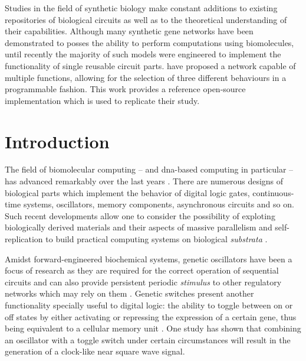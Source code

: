 
  \noindent Studies in the field of synthetic biology make constant additions to existing repositories of biological circuits as well as to the theoretical understanding of their capabilities.
  Although many synthetic gene networks have been demonstrated to posses the ability to perform computations using biomolecules, until recently the majority of such models were engineered to implement the functionality of single reusable circuit parts.
  \citet{originals} have proposed a network capable of multiple functions, allowing for the selection of three different behaviours in a programmable fashion.
  This work provides a reference open-source implementation which is used to replicate their study.


\section{Introduction}

  The field of biomolecular computing -- and \acs{dna}-based computing in particular -- has advanced remarkably over the last years \cite{analog}.
  There are numerous designs of biological parts which implement the behavior of digital logic gates\supercite{async}, continuous-time systems\supercite{analog}, oscillators\supercite{repressilator}, memory components\supercite{async}, asynchronous circuits\supercite{async} and so on.
  Such recent developments allow one to consider the possibility of exploting biologically derived materials and their aspects of massive parallelism and self-replication to build practical computing systems on biological \textit{substrata} \cite{youtuber}.

  Amidst forward-engineered biochemical systems, genetic oscillators have been a focus of research as they are required for the correct operation of sequential circuits and can also provide persistent periodic \textit{stimulus} to other regulatory networks which may rely on them \cite{ingalls}.
  Genetic switches present another functionality specially useful to digital logic: the ability to toggle between on or off states by either activating or repressing the expression of a certain gene, thus being equivalent to a cellular memory unit \cite{youtuber}.
  One study\supercite{clock} has shown that combining an oscillator with a toggle switch under certain circumstances will result in the generation of a clock-like near square wave signal.

